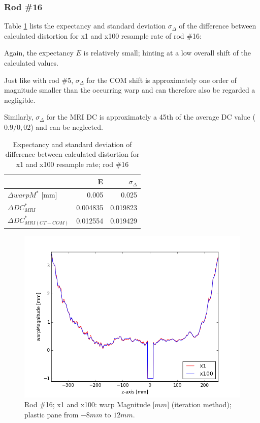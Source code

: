 \clearpage

\subsubsection{Rod \#16}

Table \ref{tab:Delta-resample_16} lists the expectancy and standard deviation $\sigma_\Delta$ of the difference between calculated distortion for x1 and x100 resample rate of rod \#16:

Again, the expectancy $E$ is relatively small; hinting at a low overall shift of the calculated values.

Just like with rod \#5, $\sigma_\Delta$ for the COM shift is approximately one order of magnitude smaller than the occurring warp and can therefore also be regarded a negligible.

Similarly, $\sigma_\Delta$ for the MRI DC is approximately a 45th of the average DC value ($0.9/0,02$) and can be neglected.

\begin{table}[!tbh]
\centering
\caption{Expectancy and standard deviation of difference between calculated distortion for x1 and x100 resample rate; rod \#16}
\begin{tabular}{l|rr}
& E         & $\sigma_\Delta$   \\
\toprule
$\Delta warpM^*$ [mm]  & 0.005     & 0.025    \\
$\Delta DC^*_{MRI}$         & 0.004835   & 0.019823  \\
$\Delta DC^*_{MRI(CT-COM)}$ & 0.012554   & 0.019429
\end{tabular}
\label{tab:Delta-resample_16}
\end{table}

\begin{figure}[!tbh]
    \centering
    \includegraphics[scale=0.6]{../fig/python/ph3_v2/warp/ph3_MR_v2_x1-100_warpMagnitude_iter.png}
    \caption[Rod \#16; x1 and x100: warp Magnitude (iteration method).]{Rod \#16; x1 and x100: warp Magnitude [$mm$] (iteration method); plastic pane from $-8mm$ to $12mm$.}
    \label{fig:ph3_v2_warpMagnitude_x1-100}
\end{figure}

